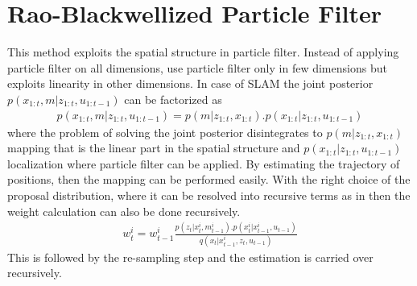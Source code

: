 \section{Rao-Blackwellized Particle Filter}
 This method exploits the spatial structure in particle filter. Instead of applying particle filter on all dimensions, use particle filter only in few dimensions but exploits linearity in other dimensions. In case of SLAM the joint posterior $p(x_{1:t}, m | z_{1:t}, u_{1:t-1})$ can be factorized as 
\begin{gather} \label{RAoB}
    p(x_{1:t}, m | z_{1:t}, u_{1:t-1}) = p(m | z_{1:t}, x_{1:t}).p(x_{1:t} | z_{1:t}, u_{1:t-1})
\end{gather}
where the problem of solving the joint posterior disintegrates to $p(m | z_{1:t}, x_{1:t})$ mapping that is the linear part in the spatial structure and $p(x_{1:t} | z_{1:t}, u_{1:t-1})$ localization where particle filter can be applied. By estimating the trajectory of positions, then the mapping can be performed easily. With the right choice of the proposal distribution, where it can be resolved into recursive terms as in  then the weight calculation can also be done recursively.
\begin{gather} \label{RaoB_weight}
    w_{t}^{i} = w_{t-1}^{i} \frac{p(z_{t}|x_{t}^{i}, m_{t-1}^{i}). p(x_{t}^{i}|x_{t-1}^{i}, u_{t-1})}{q(x_t|x_{t-1}^{i},z_{t}, u_{t-1})}
\end{gather}
This is followed by the re-sampling step and the estimation is carried over recursively.
